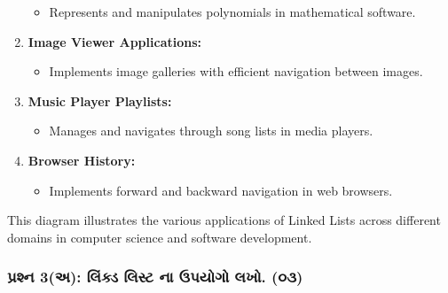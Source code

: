 \begin{enumerate}
  \begin{itemize}
  \tightlist
  \item
    Represents and manipulates polynomials in mathematical software.
  \end{itemize}
\item
  \textbf{Image Viewer Applications:}

  \begin{itemize}
  \tightlist
  \item
    Implements image galleries with efficient navigation between images.
  \end{itemize}
\item
  \textbf{Music Player Playlists:}

  \begin{itemize}
  \tightlist
  \item
    Manages and navigates through song lists in media players.
  \end{itemize}
\item
  \textbf{Browser History:}

  \begin{itemize}
  \tightlist
  \item
    Implements forward and backward navigation in web browsers.
  \end{itemize}
\end{enumerate}

\begin{Shaded}
\begin{Highlighting}[]
\end{Highlighting}
\end{Shaded}

This diagram illustrates the various applications of Linked Lists across
different domains in computer science and software development.

\hypertarget{uxaaauxab0uxab6uxaa8-3uxa85-uxab2uxa95uxaa1-uxab2uxab8uxa9f-uxaa8-uxa89uxaaauxaafuxa97-uxab2uxa96.-uxae6uxae9}{%
\subsubsection{પ્રશ્ન 3(અ): લિંક્ડ લિસ્ટ ના ઉપયોગો લખો.
(૦૩)}\label{uxaaauxab0uxab6uxaa8-3uxa85-uxab2uxa95uxaa1-uxab2uxab8uxa9f-uxaa8-uxa89uxaaauxaafuxa97-uxab2uxa96.-uxae6uxae9}}

